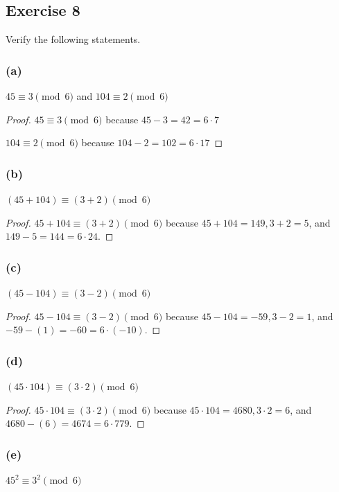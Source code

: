 \documentclass[14pt]{extarticle}
\begin{document}
\subsection{Exercise 8}
Verify the following statements.

\subsubsection{(a)}
\(45 \equiv 3 \pmod 6\) and \(104 \equiv 2 \pmod 6\)

\begin{proof}
\(45 \equiv 3 \pmod 6\) because \(45 - 3 = 42 = 6 \cdot 7\)

\(104 \equiv 2 \pmod 6\) because \(104 - 2 = 102 = 6 \cdot 17\)
\end{proof}

\subsubsection{(b)}
\((45 + 104) \equiv (3 + 2) \pmod 6\)

\begin{proof}
\(45 + 104 \equiv (3 + 2) \pmod 6\) because \(45 + 104 = 149, 3 + 2 = 5\), and \(149 - 5 = 144 = 6 \cdot 24\).
\end{proof}

\subsubsection{(c)}
\((45 - 104) \equiv (3 - 2) \pmod 6\)

\begin{proof}
\(45 - 104 \equiv (3 - 2) \pmod 6\) because \(45 - 104 = -59, 3 - 2 = 1\), and \(-59 - (1) = -60 = 6 \cdot (-10)\).
\end{proof}

\subsubsection{(d)}
\((45 \cdot 104) \equiv (3 \cdot 2) \pmod 6\)

\begin{proof}
\(45 \cdot 104 \equiv (3 \cdot 2) \pmod 6\) because \(45 \cdot 104 = 4680, 3 \cdot 2 = 6\), and \(4680 - (6) = 4674 
= 6 \cdot 779\).
\end{proof}

\subsubsection{(e)}
\(45^2 \equiv 3^2 \pmod 6\)
\end{document}
